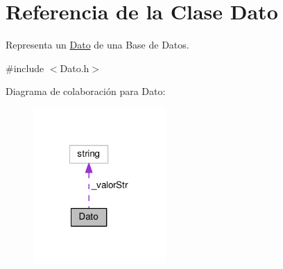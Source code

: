 \hypertarget{classDato}{\section{Referencia de la Clase Dato}
\label{classDato}
}


Representa un \hyperlink{classDato}{Dato} de una Base de Datos.  




{\ttfamily \#include $<$Dato.\-h$>$}



Diagrama de colaboración para Dato\-:
\nopagebreak
\begin{figure}[H]
\begin{center}
\leavevmode
\includegraphics[width=143pt]{classDato__coll__graph}
\end{center}
\end{figure}
